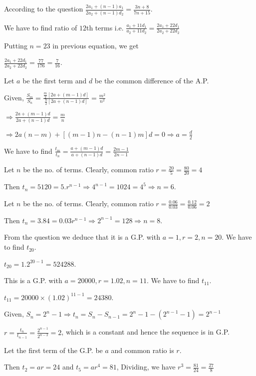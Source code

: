   According to the question $\frac{2a_1 + (n - 1)a_1}{2a_2 + (n - 1)d_2} = \frac{3n + 8}{7n + 15}$.

  We have to find ratio of $12$th terms i.e. $\frac{a_1 + 11d_1}{a_2 + 11d_2} = \frac{2a_1 + 22d_1}{2a_2 + 22d_2}$

  Putting $n = 23$ in previous equation, we get

  $\frac{2a_1 + 22d_1}{2a_2 + 22d_2} = \frac{77}{176} = \frac{7}{16}$.
\item Let $a$ be the first term and $d$ be the common difference of the A.P.

  Given, $\frac{S_m}{S_n} = \frac{\tfrac{m}{2}[2a + (m - 1)d]}{\tfrac{n}{2}[2a + (n - 1)d]} = \frac{m^2}{n^2}$

  $\Rightarrow \frac{2a + (m - 1)d}{2a + (n - 1)d} = \frac{m}{n}$

  $\Rightarrow 2a(n - m) + [(m - 1)n - (n - 1)m]d = 0 \Rightarrow a = \frac{d}{2}$

  We have to find $\frac{t_m}{t_n} = \frac{a + (m - 1)d}{a + (n - 1)d} = \frac{2m - 1}{2n - 1}$
\item Let $n$ be the no. of terms. Clearly, common ratio $r = \frac{20}{5} = \frac{80}{20} = 4$

  Then $t_n = 5120 = 5.r^{n - 1} \Rightarrow 4^{n - 1} = 1024 = 4^5 \Rightarrow n = 6$.
\item Let $n$ be the no. of terms. Clearly, common ratio $r = \frac{0.06}{0.03} = \frac{0.12}{0.06} = 2$

  Then $t_n = 3.84 = 0.03r^{n - 1} \Rightarrow 2^{n - 1} = 128 \Rightarrow n = 8$.
\item From the question we deduce that it is a G.P. with $a = 1, r = 2, n = 20$. We have to find $t_{20}$.

  $t_{20} = 1.2^{20 - 1} = 524288$.
\item This is a G.P. with $a = 20000, r = 1.02, n = 11$. We have to find $t_{11}$.

  $t_{11} = 20000\times(1.02)^{11 - 1} = 24380$.
\item Given, $S_n = 2^n - 1 \Rightarrow t_n = S_n - S_{n - 1} = 2^n - 1 - (2^{n - 1} - 1) = 2^{n - 1}$

  $r = \frac{t_n}{t_{n - 1}} = \frac{2^{n - 1}}{2^{n - 2}} = 2$, which is a constant and hence the sequence is in G.P.
\item Let the first term of the G.P. be $a$ and common ratio is $r$.

  Then $t_2 = ar = 24$ and $t_5 = ar^4 = 81$, Dividing, we have $r^3 = \frac{81}{24} = \frac{27}{8}$

